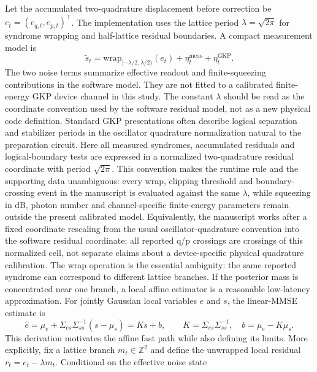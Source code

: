 \documentclass[11pt]{article}
\begin{document}
Let the accumulated two-quadrature displacement before correction be
\(e_t=(e_{q,t},e_{p,t})^\top\).  The implementation uses the lattice period
\(\lambda=\sqrt{2\pi}\) for syndrome wrapping and half-lattice residual
boundaries.  A compact measurement model is
\begin{equation}
    \tilde{s}_t = \mathrm{wrap}_{[-\lambda/2,\lambda/2)}(e_t)
    + \eta_t^{\mathrm{meas}}+\eta_t^{\mathrm{GKP}} .
\end{equation}
The two noise terms summarize effective readout and finite-squeezing
contributions in the software model.  They are not fitted to a calibrated
finite-energy GKP device channel in this study.
The constant \(\lambda\) should be read as the coordinate convention used by
the software residual model, not as a new physical code definition.  Standard
GKP presentations often describe logical separation and stabilizer periods in
the oscillator quadrature normalization natural to the preparation circuit.
Here all measured syndromes, accumulated residuals and logical-boundary tests
are expressed in a normalized two-quadrature residual coordinate with period
\(\sqrt{2\pi}\).  This convention makes the runtime rule and the supporting data
unambiguous: every wrap, clipping threshold and boundary-crossing event in the
manuscript is evaluated against the same \(\lambda\), while squeezing in dB,
photon number and channel-specific finite-energy parameters remain outside the
present calibrated model.
Equivalently, the manuscript works after a fixed coordinate rescaling from the
usual oscillator-quadrature convention into the software residual coordinate;
all reported q/p crossings are crossings of this normalized cell, not separate
claims about a device-specific physical quadrature calibration.
The wrap operation is the essential ambiguity: the same reported syndrome can
correspond to different lattice branches.  If the posterior mass is
concentrated near one branch, a local affine estimator is a reasonable
low-latency approximation.  For jointly Gaussian local variables \(e\) and
\(s\), the linear-MMSE estimate is
\begin{equation}
    \hat e = \mu_e + \Sigma_{es}\Sigma_{ss}^{-1}(s-\mu_s)
    = Ks+b,\qquad
    K=\Sigma_{es}\Sigma_{ss}^{-1},\quad
    b=\mu_e-K\mu_s .
\end{equation}
This derivation motivates the affine fast path while also defining its
limits.  More explicitly, fix a lattice branch
\(m_t\in\mathbb{Z}^2\) and define the unwrapped local residual
\(r_t=e_t-\lambda m_t\).  Conditional on the effective noise state
\end{document}

